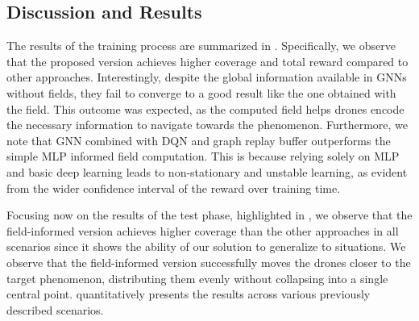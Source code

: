 \subsection{Discussion and Results}
The results of the training process are summarized in .
% 
%
Specifically, we observe that the proposed version achieves higher coverage and total reward compared to other approaches. 
%
Interestingly, despite the global information available in \acp{GNN} without fields, they fail to converge to a good result like the one obtained with the field. 
%
This outcome was expected, as the computed field helps drones encode the necessary information to navigate towards the phenomenon.
%
Furthermore, we note that \ac{GNN} combined with \ac{DQN} and graph replay buffer outperforms the simple \ac{MLP} informed field computation. 
%
This is because relying solely on \ac{MLP} and basic deep learning leads to non-stationary and unstable learning, 
 as evident from the wider confidence interval of the reward over training time.

Focusing now on the results of the test phase, highlighted in  ,
 we observe that the field-informed version achieves higher coverage than the other approaches in all scenarios since it shows the ability of our solution to generalize to situations. 
% 
We observe that the field-informed version successfully moves the drones closer to the target phenomenon, 
 distributing them evenly without collapsing into a single central point. 
  quantitatively presents the results across various previously described scenarios.

